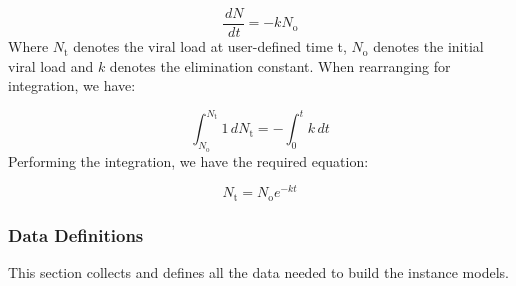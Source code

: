 \documentclass[12pt]{article}
\begin{document}
\begin{displaymath}
\frac{\,dN}{\,dt}=-k {N_{\text{o}}}
\end{displaymath}
Where ${N_{\text{t}}}$ denotes the viral load at user-defined time t, ${N_{\text{o}}}$ denotes the initial viral load and $k$ denotes the elimination constant. When rearranging for integration,  we have:

\begin{displaymath}
\int_{{N_{\text{o}}}}^{{N_{\text{t}}}}{1}\,d{N_{\text{t}}}=-\int_{0}^{t}{k}\,dt
\end{displaymath}
Performing the integration, we have the required equation:

\begin{displaymath}
{N_{\text{t}}}={N_{\text{o}}} e^{-k t}
\end{displaymath}
\subsubsection{Data Definitions}
\label{Sec:DDs}
This section collects and defines all the data needed to build the instance models.
\end{document}
